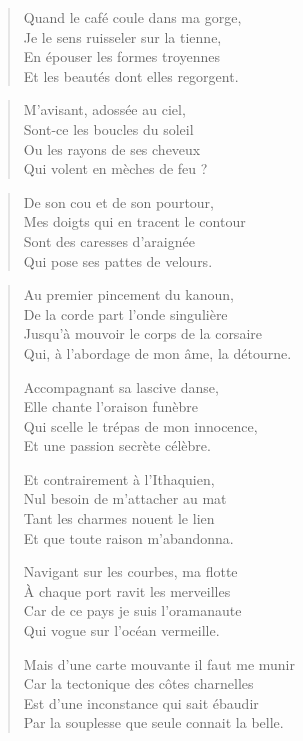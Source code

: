 \begin{verse}
Quand le café coule dans ma gorge,\\
Je le sens ruisseler sur la tienne,\\
En épouser les formes troyennes\\
Et les beautés dont elles regorgent.
\end{verse}

\begin{verse}
M’avisant, adossée au ciel,\\
Sont-ce les boucles du soleil\\
Ou les rayons de ses cheveux\\
Qui volent en mèches de feu ?
\end{verse}

\begin{verse}
De son cou et de son pourtour,\\
Mes doigts  qui en tracent le contour\\
Sont des caresses d’araignée\\
Qui pose ses pattes de velours.
\end{verse}

\begin{verse}
Au premier pincement du kanoun,\\
De la corde part l’onde singulière\\
Jusqu’à mouvoir le corps de la corsaire\\
Qui, à l’abordage de mon âme, la détourne.

Accompagnant sa lascive danse,\\
Elle chante l’oraison funèbre\\
Qui scelle le trépas de mon innocence,\\
Et une passion secrète célèbre.

Et contrairement à l’Ithaquien,\\
Nul besoin de m’attacher au mat\\
Tant les charmes nouent le lien\\
Et que toute raison m’abandonna.

Navigant sur les courbes, ma flotte\\
À chaque port ravit les merveilles\\
Car de ce pays je suis l’oramanaute\\
Qui vogue sur l’océan vermeille.

Mais d’une carte mouvante il faut me munir\\
Car la tectonique des côtes charnelles\\
Est d’une inconstance qui sait ébaudir\\
Par la souplesse que seule connait la belle.
\end{verse}





